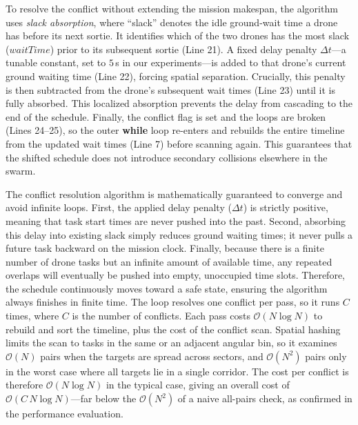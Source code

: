 \documentclass[subscriptcorrection,upint,nolists, varvw,barcolor=Goldenrod3,mathalfa=cal=euler,balance,hyphenate,french]{asmejour} %
\begin{document}
To resolve the conflict without extending the mission makespan, the algorithm uses \emph{slack absorption}, where ``slack'' denotes the idle ground-wait time a drone has before its next sortie.
It identifies which of the two drones has the most slack ($waitTime$) prior to its subsequent sortie (Line 21).
A fixed delay penalty $\Delta t$---a tunable constant, set to $5$\,s in our experiments---is added to that drone's current ground waiting time (Line 22), forcing spatial separation. Crucially, this penalty is then subtracted from the drone's subsequent wait times (Line 23) until it is fully absorbed.
This localized absorption prevents the delay from cascading to the end of the schedule.
Finally, the conflict flag is set and the loops are broken (Lines 24--25), so the outer \textbf{while} loop re-enters and rebuilds the entire timeline from the updated wait times (Line 7) before scanning again. This guarantees that the shifted schedule does not introduce secondary collisions elsewhere in the swarm.

The conflict resolution algorithm is mathematically guaranteed to converge and avoid infinite loops. First, the applied delay penalty ($\Delta t$) is strictly positive, meaning that task start times are never pushed into the past. Second, absorbing this delay into existing slack simply reduces ground waiting times; it never pulls a future task backward on the mission clock. Finally, because there is a finite number of drone tasks but an infinite amount of available time, any repeated overlaps will eventually be pushed into empty, unoccupied time slots. Therefore, the schedule continuously moves toward a safe state, ensuring the algorithm always finishes in finite time. The loop resolves one conflict per pass, so it runs $C$ times, where $C$ is the number of conflicts. Each pass costs $\mathcal{O}(N\log N)$ to rebuild and sort the timeline, plus the cost of the conflict scan. Spatial hashing limits the scan to tasks in the same or an adjacent angular bin, so it examines $\mathcal{O}(N)$ pairs when the targets are spread across sectors, and $\mathcal{O}(N^2)$ pairs only in the worst case where all targets lie in a single corridor. The cost per conflict is therefore $\mathcal{O}(N\log N)$ in the typical case, giving an overall cost of $\mathcal{O}(C\,N\log N)$---far below the $\mathcal{O}(N^2)$ of a naive all-pairs check, as confirmed in the performance evaluation.
\end{document}
